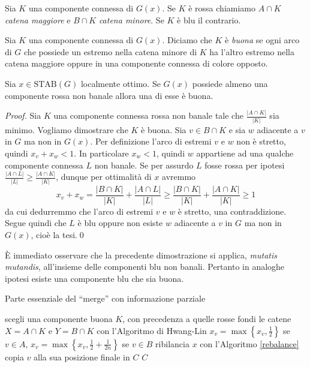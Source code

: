 \begin{definition}
	Sia \(K\) una componente connessa di \(G(x)\). Se \(K\) è rossa chiamiamo \(A\cap K\) \emph{catena maggiore} e \(B\cap K\) \emph{catena minore}. Se \(K\) è blu il contrario. 
\end{definition}
\begin{definition}
	Sia \(K\) una componente connessa di \(G(x)\). Diciamo che \(K\) è \emph{buona} se ogni arco di \(G\) che possiede un estremo nella catena minore di \(K\) ha l'altro estremo nella catena maggiore oppure in una componente connessa di colore opposto. 
\end{definition}
\begin{lemma}
	\label{goodlemma} Sia \(x\in \text{STAB}(G)\) localmente ottimo. Se \(G(x)\) possiede almeno una componente rossa non banale allora una di esse è buona. 
\end{lemma}
\begin{proof}
	Sia \(K\) una componente connessa rossa non banale tale che \(\frac{|A\cap K|}{|K|}\) sia minimo. Vogliamo dimostrare che \(K\) è buona. Sia \(v\in B\cap K\) e sia \(w\) adiacente a \(v\) in \(G\) ma non in \(G(x)\). Per definizione l'arco di estremi \(v\) e \(w\) non è stretto, quindi \(x_v+x_w<1\). In particolare \(x_w<1\), quindi \(w\) appartiene ad una qualche componente connessa \(L\) non banale. Se per assurdo \(L\) fosse rossa per ipotesi \(\frac{|A\cap L|}{|L|}\ge\frac{|A\cap K|}{|K|}\), dunque per ottimalità di \(x\) avremmo
	\[x_v+x_w=\frac{|B\cap K|}{|K|}+\frac{|A\cap L|}{|L|}\ge\frac{|B\cap K|}{|K|}+\frac{|A\cap K|}{|K|}\ge 1\]
	da cui dedurremmo che l'arco di estremi \(v\) e \(w\) è stretto, una contraddizione. Segue quindi che \(L\) è blu oppure non esiste \(w\) adiacente a \(v\) in \(G\) ma non in \(G(x)\), cioè la tesi.\qed 
\end{proof}
È immediato osservare che la precedente dimostrazione si applica, \emph{mutatis mutandis}, all'insieme delle componenti blu non banali. Pertanto in analoghe ipotesi esiste una componente blu che sia buona. 
\begin{algorithm}
	\caption{Parte essenziale del ``merge'' con informazione parziale} \label{essentialmerge} 
	\begin{algorithmic}
		[1]  \STATE scegli una componente buona \(K\), con precedenza a quelle rosse \STATE fondi le catene \(X=A\cap K\) e \(Y=B\cap K\) con l'Algoritmo di Hwang-Lin  \STATE \(x_v=\max{\left\{x_v, \frac{1}{2}\right\}}\) se \(v\in A\), \(x_v=\max{\left\{x_v, \frac{1}{2}+\frac{1}{2n}\right\}}\) se \(v\in B\) \ENDFOR \STATE ribilancia \(x\) con l'Algoritmo \ref{rebalance}   \STATE copia \(v\) alla sua posizione finale in \(C\) \ENDIF \ENDFOR \ENDWHILE \RETURN \(C\) 
	\end{algorithmic}
\end{algorithm}
